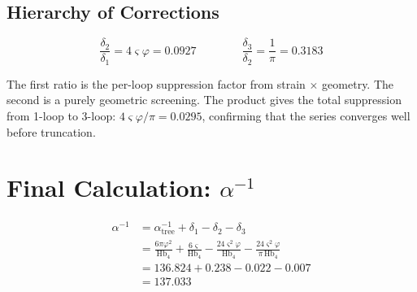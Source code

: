 \documentclass[11pt,a4paper]{article}
\theoremstyle{definition}
\newcommand{\Hbfour}{\mathrm{Hb}_4}
\newcommand{\gs}{\varsigma}
\begin{document}
\subsection{Hierarchy of Corrections}

\begin{equation}
\frac{\delta_2}{\delta_1} = 4\gs\varphi = 0.0927 \qquad\qquad \frac{\delta_3}{\delta_2} = \frac{1}{\pi} = 0.3183
\label{eq:hierarchy_ratios}
\end{equation}

The first ratio is the per-loop suppression factor from strain $\times$ geometry. The second is a purely geometric screening. The product gives the total suppression from 1-loop to 3-loop: $4\gs\varphi/\pi = 0.0295$, confirming that the series converges well before truncation.

\section{Final Calculation: $\alpha^{-1}$}
\label{sec:alpha}

\begin{align}
\alpha^{-1} &= \alpha^{-1}_{\text{tree}} + \delta_1 - \delta_2 - \delta_3 \nonumber\\
&= \frac{6\pi\varphi^2}{\Hbfour} + \frac{6\gs}{\Hbfour} - \frac{24\gs^2\varphi}{\Hbfour} - \frac{24\gs^2\varphi}{\pi\,\Hbfour} \nonumber\\
&= 136.824 + 0.238 - 0.022 - 0.007 \nonumber\\
&= \boxed{137.033}
\label{eq:alpha_final}
\end{align}
\end{document}
